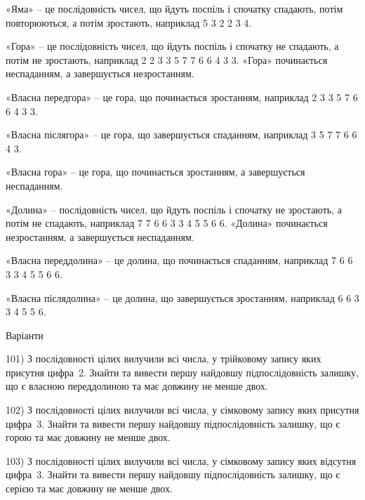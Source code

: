 \documentclass[12pt, ukrainian]{article}
\begin{document}
«Яма» – це послідовність чисел, що йдуть поспіль і спочатку спадають, потім повторюються, а потім зростають, наприклад 5 3 2 2 3 4.

«Гора» – це послідовність чисел, що йдуть поспіль і спочатку не спадають, а потім не зростають, наприклад 2 2 3 3 5 7 7 6 6 4 3 3. «Гора» починається неспаданням, а завершується незростанням. 

«Власна передгора» – це гора, що починається зростанням, наприклад 2 3 3 5 7 6 6 4 3 3. 

«Власна післягора» – це гора, що завершується спаданням, наприклад  3 5 7 7 6 6 4 3.

«Власна гора» – це гора, що починається зростанням, а завершується неспаданням.

«Долина» – послідовність чисел, що йдуть поспіль і спочатку не зростають, а потім не спадають, наприклад 7 7 6 6 3 3 4 5 5 6 6. «Долина» починається незростанням, а завершується неспаданням. 

«Власна переддолина» – це долина, що починається спаданням, наприклад 7 6 6 3 3 4 5 5 6 6. 

«Власна післядолина» – це долина, що завершується зростанням, наприклад 6 6 3 3 4 5 5 6.

\par \bigskip
\newpage

{\center  Варіанти \par \bigskip\bigskip}

101) \space 
З послідовності цілих вилучили всі числа, у трійковому запису яких присутня цифра~2. Знайти та вивести першу найдовшу підпослідовність залишку, що є власною переддолиною та має довжину не менше двох.

\par
\vspace{0.9cm}
102) \space 
З послідовності цілих вилучили всі числа, у сімковому запису яких присутня цифра~3. Знайти та вивести першу найдовшу підпослідовність залишку, що є горою та має довжину не менше двох.

\par
\vspace{0.9cm}
103) \space 
З послідовності цілих вилучили всі числа, у сімковому запису яких відсутня цифра~3. Знайти та вивести першу найдовшу підпослідовність залишку, що є серією та має довжину не менше двох.
\end{document}
